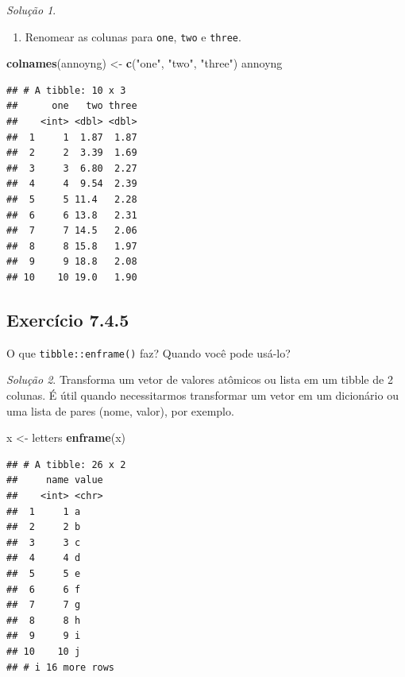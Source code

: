 \documentclass[
]{latex/krantz}
\newenvironment{Shaded}{\begin{snugshade}}{\end{snugshade}}
\newcommand{\FunctionTok}[1]{\textcolor[rgb]{0.13,0.29,0.53}{\textbf{#1}}}
\newcommand{\NormalTok}[1]{#1}
\newcommand{\OtherTok}[1]{\textcolor[rgb]{0.56,0.35,0.01}{#1}}
\newcommand{\StringTok}[1]{\textcolor[rgb]{0.31,0.60,0.02}{#1}}
\providecommand{\tightlist}{%
  \setlength{\itemsep}{0pt}\setlength{\parskip}{0pt}}
\theoremstyle{definition}
\theoremstyle{definition}
\theoremstyle{definition}
\theoremstyle{definition}
\theoremstyle{remark}
\newtheorem*{solution}{Solução}
\begin{document}
\begin{solution}
\begin{enumerate}
\def\labelenumi{\alph{enumi}.}
\setcounter{enumi}{3}
\tightlist
\item
  Renomear as colunas para \texttt{one}, \texttt{two} e \texttt{three}.
\end{enumerate}

\begin{Shaded}
\begin{Highlighting}[]
\FunctionTok{colnames}\NormalTok{(annoyng) }\OtherTok{\textless{}{-}} \FunctionTok{c}\NormalTok{(}\StringTok{"one"}\NormalTok{, }\StringTok{"two"}\NormalTok{, }\StringTok{"three"}\NormalTok{)}
\NormalTok{annoyng}
\end{Highlighting}
\end{Shaded}

\begin{verbatim}
## # A tibble: 10 x 3
##      one   two three
##    <int> <dbl> <dbl>
##  1     1  1.87  1.87
##  2     2  3.39  1.69
##  3     3  6.80  2.27
##  4     4  9.54  2.39
##  5     5 11.4   2.28
##  6     6 13.8   2.31
##  7     7 14.5   2.06
##  8     8 15.8   1.97
##  9     9 18.8   2.08
## 10    10 19.0   1.90
\end{verbatim}

\end{solution}

\hypertarget{exr7-4-5}{%
\subsection*{Exercício 7.4.5}\label{exr7-4-5}}

O que \texttt{tibble::enframe()} faz? Quando você pode usá-lo?

\begin{solution}

Transforma um vetor de valores atômicos ou lista em um tibble de 2 colunas. É útil quando necessitarmos transformar um vetor em um dicionário ou uma lista de pares (nome, valor), por exemplo.

\begin{Shaded}
\begin{Highlighting}[]
\NormalTok{x }\OtherTok{\textless{}{-}}\NormalTok{ letters}
\FunctionTok{enframe}\NormalTok{(x)}
\end{Highlighting}
\end{Shaded}

\begin{verbatim}
## # A tibble: 26 x 2
##     name value
##    <int> <chr>
##  1     1 a    
##  2     2 b    
##  3     3 c    
##  4     4 d    
##  5     5 e    
##  6     6 f    
##  7     7 g    
##  8     8 h    
##  9     9 i    
## 10    10 j    
## # i 16 more rows
\end{verbatim}

\end{solution}
\end{document}
